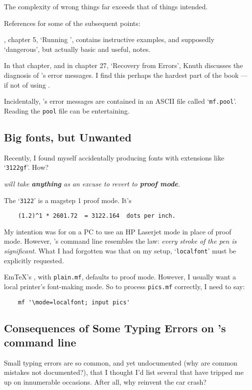 The complexity of wrong things far exceeds that of things intended.

References for some of the subsequent points:

\MFbook{}, chapter 5, `Running \MF{}', contains
instructive examples, and supposedly `dangerous', but actually basic
and useful, notes.

In that chapter, and in chapter 27, `Recovery from Errors', {\sc Knuth}
discusses the diagnosis of \MF{}'s error messages.  I find this
perhaps the hardest part of the book --- if not of using \MF{}.

Incidentally, \MF{}'s error messages are contained in an ASCII
file called `{\tt mf.pool}'.  Reading the {\tt pool} file can be
entertaining.


\subsection{Big fonts, but Unwanted}\label{sec:proof}

Recently, I found myself accidentally producing fonts with extensions
like `{\tt 3122gf}'.  How?

{\em \MF{} will take\/ {\bf anything} as an excuse to revert
to\/ {\bf proof mode}.}

The `{\tt 3122}' is a magstep 1 proof mode.  It's
\begin{verbatim}
    (1.2)^1 * 2601.72  = 3122.164  dots per inch.
\end{verbatim}

My intention was for \MF{} on a PC to use an HP Laserjet mode in
place of proof mode.  However, \MF{}'s command line resembles
the law:  {\em every stroke of the pen is significant}.  What I had
forgotten was that on my setup, `{\tt localfont}' must be explicitly
requested.

Em\TeX{}'s \MF{}, with {\tt plain.mf}, defaults to proof mode.
However, I usually want a local printer's font-making mode.
So to process {\tt pics.mf} correctly, I need to say:
\begin{verbatim}
    mf '\mode=localfont; input pics'
\end{verbatim}


\subsection{Consequences of Some Typing Errors on \MF{}'s
  command line}\label{sub:typo}

Small typing errors are so common, and yet undocumented (why are
common mistakes not documented?), that I thought I'd list several that
have tripped me up on innumerable occasions.  After all, why reinvent
the car crash?

